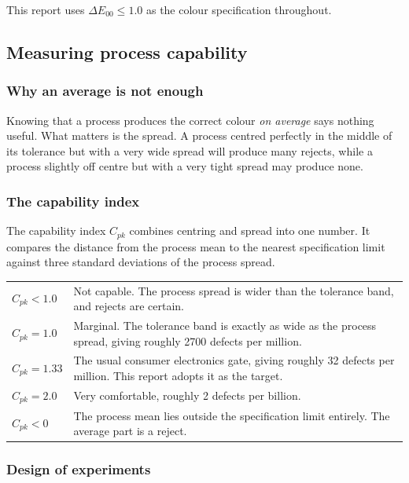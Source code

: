 \documentclass[11pt,a4paper]{article}
\newcommand{\dE}{\ensuremath{\Delta E_{00}}}
\newcommand{\Cpk}{\ensuremath{C_{pk}}}
\begin{document}
This report uses $\dE \le 1.0$ as the colour specification throughout.

\subsection{Measuring process capability}

\subsubsection{Why an average is not enough}

Knowing that a process produces the correct colour \emph{on average} says
nothing useful. What matters is the spread. A process centred perfectly in the
middle of its tolerance but with a very wide spread will produce many rejects,
while a process slightly off centre but with a very tight spread may produce
none.

\subsubsection{The capability index}

The capability index $\Cpk$ combines centring and spread into one number. It
compares the distance from the process mean to the nearest specification limit
against three standard deviations of the process spread.

\begin{defbox}
\begin{tabular}{@{}p{2.6cm}p{11.2cm}@{}}
$\Cpk < 1.0$   & Not capable. The process spread is wider than the tolerance
                 band, and rejects are certain. \\[2pt]
$\Cpk = 1.0$   & Marginal. The tolerance band is exactly as wide as the process
                 spread, giving roughly 2700 defects per million. \\[2pt]
$\Cpk = 1.33$  & The usual consumer electronics gate, giving roughly 32 defects
                 per million. This report adopts it as the target. \\[2pt]
$\Cpk = 2.0$   & Very comfortable, roughly 2 defects per billion. \\[2pt]
$\Cpk < 0$     & The process mean lies outside the specification limit
                 entirely. The average part is a reject. \\
\end{tabular}
\end{defbox}

\subsubsection{Design of experiments}
\end{document}
